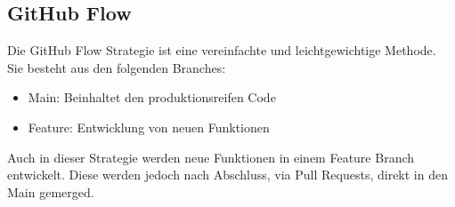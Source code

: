 \subsection{GitHub Flow}
\label{sec:GitHubFlow}
Die GitHub Flow Strategie ist eine vereinfachte und leichtgewichtige Methode. Sie besteht aus den folgenden Branches:
\begin{itemize}
    \item Main: Beinhaltet den produktionsreifen Code  
    \item Feature: Entwicklung von neuen Funktionen
\end{itemize}
Auch in dieser Strategie werden neue Funktionen in einem Feature Branch entwickelt. Diese werden jedoch nach Abschluss, via Pull Requests, direkt in den Main gemerged.
\parencite{priyanka_gowdaashwath_narayana_gowda_git-branching-and-release-strategies_2022}





